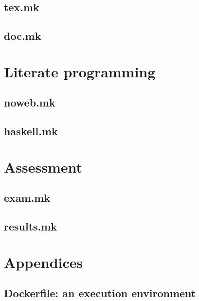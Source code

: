 \documentclass{report}
\begin{document}
\chapter{tex.mk}


\chapter{doc.mk}



\part{Literate programming}

\chapter{noweb.mk}


\chapter{haskell.mk}



\part{Assessment}

\chapter{exam.mk}


\chapter{results.mk}



\appendix
\part{Appendices}

\chapter{Dockerfile: an execution environment}


%


\printbibliography[heading=bibintoc]{}
\end{document}
